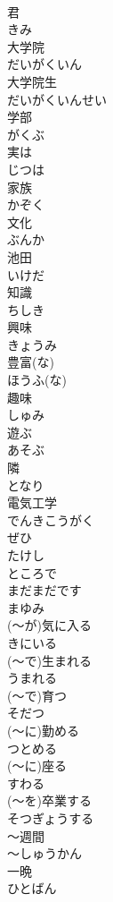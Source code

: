 \documentclass[8pt]{extreport}
\begin{document}
\begin{CJK}{UTF8}{min}
\\	君	
\\	きみ
\\	大学院	
\\	だいがくいん
\\	大学院生	
\\	だいがくいんせい
\\	学部	
\\	がくぶ
\\	実は	
\\	じつは
\\	家族	
\\	かぞく
\\	文化	
\\	ぶんか
\\	池田	
\\	いけだ
\\	知識	
\\	ちしき
\\	興味	
\\	きょうみ
\\	豊富(な)	
\\	ほうふ(な)
\\	趣味	
\\	しゅみ
\\	遊ぶ	
\\	あそぶ
\\	隣	
\\	となり
\\	電気工学	
\\	でんきこうがく
\\	ぜひ	
\\	たけし	
\\	ところで	
\\	まだまだです	
\\	まゆみ	
\\	(～が)気に入る	
\\	きにいる
\\	(～で)生まれる	
\\	うまれる
\\	(～で)育つ	
\\	そだつ
\\	(～に)勤める	
\\	つとめる
\\	(～に)座る	
\\	すわる
\\	(～を)卒業する	
\\	そつぎょうする
\\	～週間	
\\	～しゅうかん
\\	一晩	
\\	ひとばん

\end{CJK}
\end{document}
